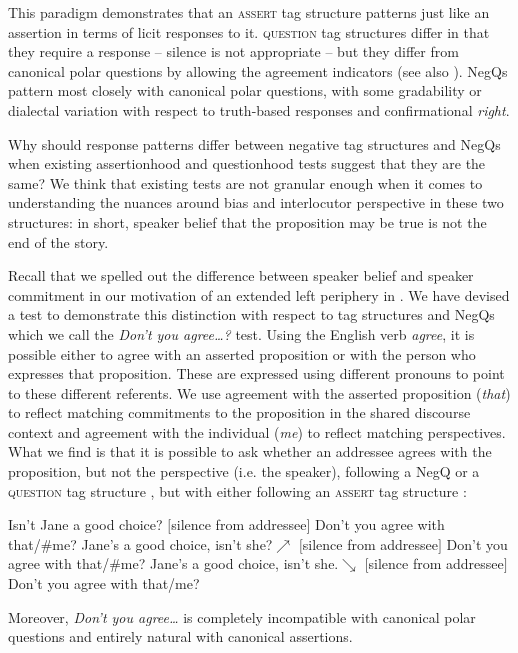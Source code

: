 \documentclass[output=paper,colorlinks,citecolor=brown]{langscibook}
\begin{document}
This paradigm demonstrates that an \textsc{assert} tag structure patterns just like an assertion in terms of licit responses to it. \textsc{question} tag structures differ in that they require a response – silence is not appropriate – but they differ from canonical polar questions by allowing the agreement indicators (see also \citealt[183]{holmberg2016}). NegQs pattern most closely with canonical polar questions, with some gradability or dialectal variation with respect to truth-based responses and confirmational \textit{right}.

Why should response patterns differ between negative tag structures and Neg\-Qs when existing assertionhood and questionhood tests suggest that they are the same? We think that existing tests are not granular enough when it comes to understanding the nuances around bias and interlocutor perspective in these two structures: in short, speaker belief that the proposition may be true is not the end of the story.

Recall that we spelled out the difference between speaker belief and speaker commitment in our motivation of an extended left periphery in . We have devised a test to demonstrate this distinction with respect to tag structures and NegQs which we call the \textit{Don't you agree\ldots? }test. Using the English verb \textit{agree}, it is possible either to agree with an asserted proposition or with the person who expresses that proposition. These are expressed using different pronouns to point to these different referents. We use agreement with the asserted proposition (\textit{that}) to reflect matching commitments to the proposition in the shared discourse context and agreement with the individual (\textit{me}) to reflect matching perspectives. What we find is that it is possible to ask whether an addressee agrees with the proposition, but not the perspective (i.e. the speaker), following a NegQ  or a \textsc{question} tag structure , but with either following an \textsc{assert} tag structure :

\ea Isn't Jane a good choice? $[$silence from addressee$]$ Don't you agree with that/{\#}me?\label{agree:negq}
\ex Jane's a good choice, isn't she?$\nearrow$ $[$silence from addressee$]$ Don't you agree with that/{\#}me?\label{agree:qtag}
\ex Jane's a good choice, isn't she.$\searrow$ $[$silence from addressee$]$ Don't you agree with that/me?\label{agree:atag}
\z

Moreover, \textit{Don't you agree\ldots} is completely incompatible with canonical polar questions and entirely natural with canonical assertions.
\end{document}
